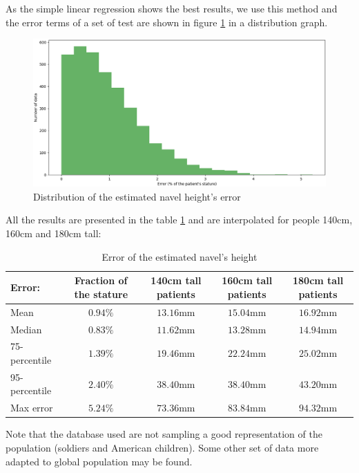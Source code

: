 \documentclass{article}
\begin{document}
As the simple linear regression shows the best results, we use this method and the error terms of a set of test are shown in figure \ref{fig:distrib_estimated_navel} in a distribution graph.

\begin{figure}[H]
    \centering
    \includegraphics[width=12cm]{images/navel/estimation/distrib_estimated_navel.png}
    \caption{Distribution of the estimated navel height's error}
    \label{fig:distrib_estimated_navel}
\end{figure}

All the results are presented in the table \ref{tab:results_error_estimated_navel} and are interpolated for people 140cm, 160cm and 180cm tall:

\begin{table}[H]
    \centering
    \begin{tabular}{|l|c|c|c|c|}
        \hline 
        Error: & Fraction of the stature & 140cm tall patients & 160cm tall patients & 180cm tall patients 
        \\ \hline
        Mean & $0.94\%$ & $13.16$mm & $15.04$mm & $16.92$mm 
        \\ \hline
        Median & $0.83\%$ & $11.62$mm & $13.28$mm & $14.94$mm 
        \\ \hline
        75-percentile & $1.39\%$ & $19.46$mm & $22.24$mm & $25.02$mm 
        \\ \hline
        95-percentile & $2.40\%$ & $38.40$mm & $38.40$mm & $43.20$mm 
        \\ \hline
        Max error & $5.24\%$ & $73.36$mm & $83.84$mm & $94.32$mm 
        \\ \hline 
    \end{tabular}
    \caption{Error of the estimated navel's height}
    \label{tab:results_error_estimated_navel}
\end{table}

Note that the database used are not sampling a good representation of the population (soldiers and American children). Some other set of data more adapted to global population may be found. 
\end{document}
